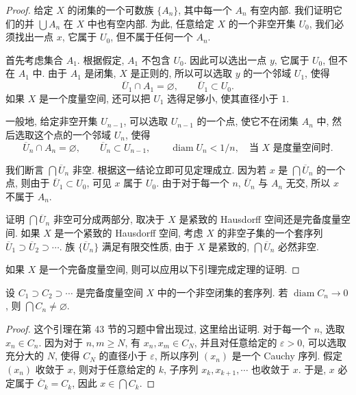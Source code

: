 \begin{proof}
给定 $X$ 的闭集的一个可数族 $\{A_n\}$, 其中每一个 $A_n$ 有空内部. 我们证明它们的并 $\bigcup A_n$ 在 $X$ 中也有空内部. 为此, 任意给定 $X$ 的一个非空开集 $U_0$, 我们必须找出一点 $x$, 它属于 $U_0$, 但不属于任何一个 $A_n$.

首先考虑集合 $A_1$. 根据假定, $A_1$ 不包含 $U_0$. 因此可以选出一点 $y$, 它属于 $U_0$, 但不在 $A_1$ 中. 由于 $A_1$ 是闭集, $X$ 是正则的, 所以可以选取 $y$ 的一个邻域 $U_1$, 使得
\[
\overline{U}_{1}\cap A_{1}=\varnothing,\qquad
\overline{U}_{1}\subset U_{0}.
\]
如果 $X$ 是一个度量空间, 还可以把 $U_1$ 选得足够小, 使其直径小于 $1$.

一般地, 给定非空开集 $U_{n-1}$, 可以选取 $U_{n-1}$ 的一个点, 使它不在闭集 $A_n$ 中, 然后选取这个点的一个邻域 $U_n$, 使得
\[
\overline{U}_{n}\cap A_{n}=\varnothing,\qquad
\overline{U}_{n}\subset U_{n-1},\qquad
\operatorname{diam}U_{n}<1/n,\quad\text{当 }X\text{ 是度量空间时}.
\]

我们断言 $\bigcap\overline{U}_{n}$ 非空. 根据这一结论立即可见定理成立. 因为若 $x$ 是 $\bigcap\overline{U}_{n}$ 的一个点, 则由于 $\overline{U}_{1}\subset U_{0}$, 可见 $x$ 属于 $U_{0}$. 由于对于每一个 $n$, $\overline{U}_{n}$ 与 $A_n$ 无交, 所以 $x$ 不属于 $A_n$.

证明 $\bigcap\overline{U}_{n}$ 非空可分成两部分, 取决于 $X$ 是紧致的 Hausdorff 空间还是完备度量空间. 如果 $X$ 是一个紧致的 Hausdorff 空间, 考虑 $X$ 的非空子集的一个套序列 $\overline{U}_{1}\supset\overline{U}_{2}\supset\cdots$. 族 $\{\overline{U}_{n}\}$ 满足有限交性质, 由于 $X$ 是紧致的, $\bigcap\overline{U}_{n}$ 必然非空.

如果 $X$ 是一个完备度量空间, 则可以应用以下引理完成定理的证明.
\end{proof}

\begin{lemma}
\label{lemma:ch08-sec48-48-3}
设 $C_{1}\supset C_{2}\supset\cdots$ 是完备度量空间 $X$ 中的一个非空闭集的套序列. 若 $\operatorname{diam}C_{n}\to 0$, 则 $\bigcap C_{n}\neq\varnothing$.
\end{lemma}

\begin{proof}
这个引理在第 43 节的习题中曾出现过, 这里给出证明. 对于每一个 $n$, 选取 $x_{n}\in C_{n}$. 因为对于 $n,m\geqslant N$, 有 $x_{n},x_{m}\in C_{N}$, 并且对任意给定的 $\varepsilon>0$, 可以选取充分大的 $N$, 使得 $C_{N}$ 的直径小于 $\varepsilon$, 所以序列 $(x_n)$ 是一个 Cauchy 序列. 假定 $(x_n)$ 收敛于 $x$, 则对于任意给定的 $k$, 子序列 $x_k,x_{k+1},\cdots$ 也收敛于 $x$. 于是, $x$ 必定属于 $\overline{C}_{k}=C_{k}$, 因此 $x\in\bigcap C_{k}$.
\end{proof}

